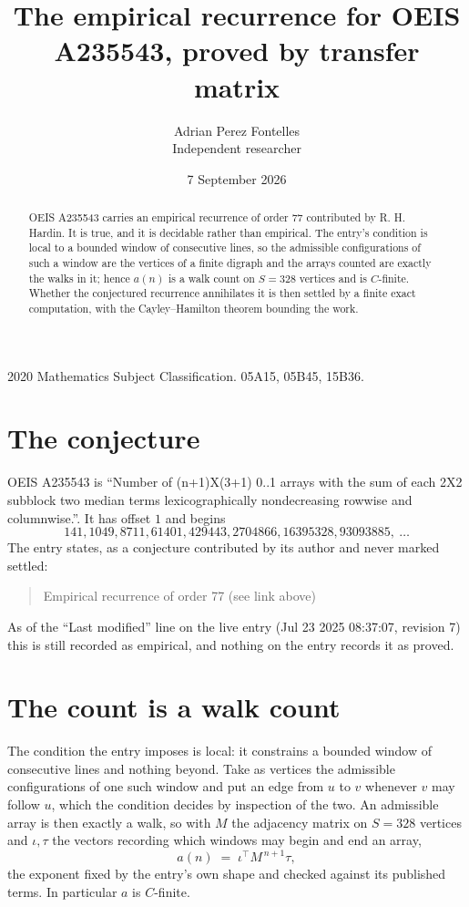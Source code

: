 \documentclass[11pt,a4paper]{article}
\title{The empirical recurrence for OEIS A235543, proved by transfer matrix}
\author{Adrian Perez Fontelles\\ \small Independent researcher}
\date{7 September 2026}
\theoremstyle{plain}
\theoremstyle{definition}
\begin{document}
\maketitle

\begin{abstract}
OEIS A235543 carries an empirical recurrence of order $77$ contributed by R. H. Hardin. It is
true, and it is decidable rather than empirical. The entry's condition is local to a bounded window of consecutive lines, so
the admissible configurations of such a window are the vertices of a finite digraph and the
arrays counted are exactly the walks in it; hence $a(n)$ is a walk count on $S=328$ vertices
and is $C$-finite. Whether the conjectured recurrence annihilates it is then settled by a
finite exact computation, with the Cayley--Hamilton theorem bounding the work.
\end{abstract}

\noindent\small 2020 Mathematics Subject Classification. 05A15, 05B45, 15B36.\normalsize

\section{The conjecture}

OEIS A235543 is ``Number of (n+1)X(3+1) 0..1 arrays with the sum of each 2X2 subblock two median terms lexicographically nondecreasing rowwise and columnwise.''. It has offset $1$ and begins
\[
141, 1049, 8711, 61401, 429443, 2704866, 16395328, 93093885,\ \dots
\]
The entry states, as a conjecture contributed by its author and never marked settled:
\begin{quote}
Empirical recurrence of order 77 (see link above)
\end{quote}
As of the ``Last modified'' line on the live entry (Jul 23 2025 08:37:07, revision 7) this is still
recorded as empirical, and nothing on the entry records it as proved.

\section{The count is a walk count}

The condition the entry imposes is local: it constrains a bounded window of consecutive lines and nothing beyond. Take as
vertices the admissible configurations of one such window and put an edge from $u$ to $v$
whenever $v$ may follow $u$, which the condition decides by inspection of the two. An
admissible array is then exactly a walk, so with $M$ the adjacency matrix on $S=328$ vertices
and $\iota,\tau$ the vectors recording which windows may begin and end an array,
\[
a(n)\;=\;\iota^{\!\top}M^{\,n+1}\tau ,
\]
the exponent fixed by the entry's own shape and checked against its published terms. In
particular $a$ is $C$-finite.
\end{document}
